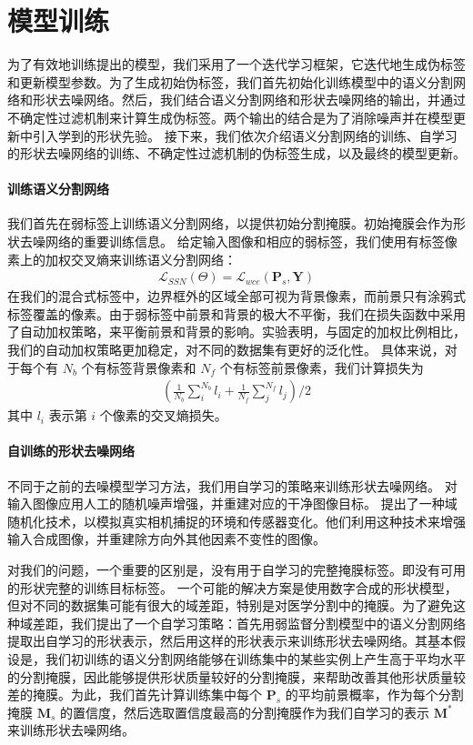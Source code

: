\section{模型训练}
为了有效地训练提出的模型，我们采用了一个迭代学习框架，它迭代地生成伪标签和更新模型参数。为了生成初始伪标签，我们首先初始化训练模型中的语义分割网络和形状去噪网络。然后，我们结合语义分割网络和形状去噪网络的输出，并通过不确定性过滤机制来计算生成伪标签。两个输出的结合是为了消除噪声并在模型更新中引入学到的形状先验。
接下来，我们依次介绍语义分割网络的训练、自学习的形状去噪网络的训练、不确定性过滤机制的伪标签生成，以及最终的模型更新。

\paragraph{训练语义分割网络}
我们首先在弱标签上训练语义分割网络，以提供初始分割掩膜。初始掩膜会作为形状去噪网络的重要训练信息。
给定输入图像和相应的弱标签，我们使用有标签像素上的加权交叉熵来训练语义分割网络：
\begin{align}
    \mathcal{L}_{SSN} (\Theta) = \mathcal{L}_{wce} (\mathbf{P}_s, \mathbf{Y})
\end{align}
在我们的混合式标签中，边界框外的区域全部可视为背景像素，而前景只有涂鸦式标签覆盖的像素。由于弱标签中前景和背景的极大不平衡，我们在损失函数中采用了自动加权策略，来平衡前景和背景的影响。实验表明，与固定的加权比例相比，我们的自动加权策略更加稳定，对不同的数据集有更好的泛化性。
具体来说，对于每个有 $N_b$ 个有标签背景像素和 $N_f$ 个有标签前景像素，我们计算损失为
\begin{align}
    (\frac{1}{N_b} \sum^{N_b}_{i} l_i + \frac{1}{N_f} \sum^{N_f}_{j} l_j) / 2
\end{align}
其中 $l_i$ 表示第 $i$ 个像素的交叉熵损失。

\paragraph{自训练的形状去噪网络}
不同于之前的去噪模型学习方法，我们用自学习的策略来训练形状去噪网络。\citet{vincent2010stacked} 对输入图像应用人工的随机噪声增强，并重建对应的干净图像目标。\citet{Sundermeyer_2018_ECCV} 提出了一种域随机化技术，以模拟真实相机捕捉的环境和传感器变化。他们利用这种技术来增强输入合成图像，并重建除方向外其他因素不变性的图像。

对我们的问题，一个重要的区别是，没有用于自学习的完整掩膜标签。即没有可用的形状完整的训练目标标签。
一个可能的解决方案是使用数字合成的形状模型，但对不同的数据集可能有很大的域差距，特别是对医学分割中的掩膜。为了避免这种域差距，我们提出了一个自学习策略：首先用弱监督分割模型中的语义分割网络提取出自学习的形状表示，然后用这样的形状表示来训练形状去噪网络。其基本假设是，我们初训练的语义分割网络能够在训练集中的某些实例上产生高于平均水平的分割掩膜，因此能够提供形状质量较好的分割掩膜，来帮助改善其他形状质量较差的掩膜。为此，我们首先计算训练集中每个 $\mathbf{P}_s$ 的平均前景概率，作为每个分割掩膜 $\mathbf{M}_s$ 的置信度，然后选取置信度最高的分割掩膜作为我们自学习的表示 $\mathbf{M}^*$ 来训练形状去噪网络。

